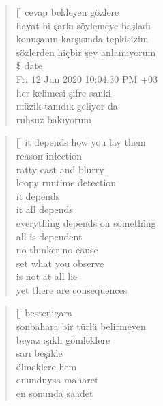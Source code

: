 \documentclass[10pt, openright, twoside]{memoir}
\theoremstyle{definition}
\begin{document}
\vspace*{\fill}
%
\newpage
{}
\vspace*{\fill}
\settowidth{\versewidth}{hayat bi şarkı söylemeye başladı}
\begin{verse}[\versewidth]
  cevap bekleyen gözlere \\
  hayat bi şarkı söylemeye başladı \\
  konuşanın karşısında tepkisizim \\
  sözlerden hiçbir şey anlamıyorum \\
  \ttfamily
  \$ date \\
  Fri 12 Jun 2020 10:04:30 PM +03 \\
  \normalfont{}
  her kelimesi şifre sanki \\
  müzik tanıdık geliyor da \\
  ruhsuz bakıyorum \\
\end{verse}
\vspace*{\fill}
%
\newpage
{}
\vspace*{\fill}
\settowidth{\versewidth}{everything depends on something}
\begin{verse}[\versewidth]
  it depends how you lay them \\
  reason infection \\
  ratty cast and blurry \\
  loopy runtime detection \\
  it depends \\
  it all depends \\
  everything depends on something \\
  all is dependent \\
  no thinker no cause \\
  set what you observe \\
  is not at all lie \\
  yet there are consequences \\
\end{verse}
\vspace*{\fill}
%
\newpage
{}
\vspace*{\fill}
\settowidth{\versewidth}{sonbahara bir türlü belirmeyen}
\begin{verse}[\versewidth]
  bestenigara \\
  sonbahara bir türlü belirmeyen \\
  beyaz ışıklı gömleklere \\
  sarı beşikle \\
  ölmeklere hem \\
  onunduysa maharet \\
  en sonunda saadet \\
\end{verse}
\end{document}
